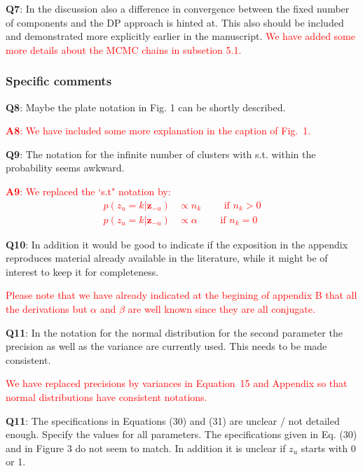 \documentclass[]{article}
\newcommand\done[1]{\textcolor{red}{#1}}
\begin{document}
	\vspace{3mm}
	\textbf{Q7}: In the discussion also a difference in convergence between the fixed number of components and the DP approach is hinted at. This also should be included and demonstrated more explicitly earlier in the manuscript.
	\done{We have added some more details about the MCMC chains in subsetion 5.1.}
	
	\subsubsection*{Specific comments}
	
	\vspace{3mm}
	\textbf{Q8}: Maybe the plate notation in Fig. 1 can be shortly described.
	
	\done{
		\textbf{A8}: We have included some more explanation in the caption of Fig.~1.
	}
	
	\vspace{3mm}
	\textbf{Q9}: The notation for the infinite number of clusters with s.t. within the probability seems awkward.
	
	\done{
		\textbf{A9}: We replaced the `s.t" notation by: 
		\begin{align}
		p(z_u = k | \mathbf{z}_{-u}) &\propto n_k \qquad \text{ if } n_k > 0\\
		p(z_u = k | \mathbf{z}_{-u}) &\propto \alpha \qquad \text{ if } n_k = 0	
		\end{align}		
	}	
	
	\vspace{3mm}
	\textbf{Q10}: 
	In addition it would be good to indicate if the exposition in the appendix reproduces material already available in the literature, while it might be of interest to keep it for completeness.
	
	\done{ Please note that we have already indicated at the begining of  appendix B that all the derivations but $\alpha$ and $\beta$ are well known since they are all conjugate. 
	}
	
	\vspace{3mm}
	\textbf{Q11}: In the notation for the normal distribution for the second parameter the precision as well as the variance are currently used. This needs to be made consistent.
	
	\done{We have replaced precisions by variances in Equation~15 and Appendix so that normal distributions have consistent notations.}
	
	\vspace{3mm}
	\textbf{Q11}: The specifications in Equations (30) and (31) are unclear / not detailed enough. Specify the values for all parameters. The specifications given in Eq. (30) and in Figure 3 do not seem to match. In addition it is unclear if $z_u$ starts with 0 or 1.
	
\end{document}
